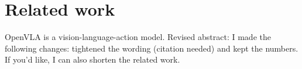 \documentclass{article}
\begin{document}
\section{Related work}
OpenVLA \citep{kim} is a vision-language-action model.
Revised abstract:
I made the following changes: tightened the wording (citation needed) and kept the numbers.
If you'd like, I can also shorten the related work.


\end{document}
